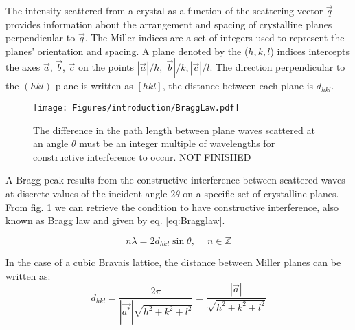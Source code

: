 The intensity scattered from a crystal as a function of the scattering vector $\vec{q}$ provides information about the arrangement and spacing of crystalline planes perpendicular to $\vec{q}$.
The Miller indices are a set of integers used to represent the planes' orientation and spacing.
A plane denoted by the ($h, k, l$) indices intercepts the axes $\vec{a}$, $\vec{b}$, $\vec{c}$ on the points $|\vec{a}|/h, |\vec{b}|/k, |\vec{c}|/l$.
The direction perpendicular to the $(hkl)$ plane is written as $[hkl]$, the distance between each plane is $d_{hkl}$.

\begin{figure}[!htb]
    \centering
    \texttt{[image: Figures/introduction/BraggLaw.pdf]}
    \caption{The difference in the path length between plane waves scattered at an angle $\theta$ must be an integer multiple of wavelengths for constructive interference to occur. NOT FINISHED}
    \label{fig:BraggLaw}
\end{figure}

A Bragg peak results from the constructive interference between scattered waves at discrete values of the incident angle $2\theta$ on a specific set of crystalline planes.
From fig. \ref{fig:BraggLaw} we can retrieve the condition to have constructive interference, also known as Bragg law and given by eq. \eqref{eq:Bragglaw}.

\begin{equation}
    \label{eq:Bragglaw}
    n\lambda = 2d_{hkl} \sin{\theta}, \quad \ n \in \mathbb{Z}
\end{equation}


In the case of a cubic Bravais lattice, the distance between Miller planes can be written as:
\begin{equation}
    \label{eq:Interplanarspacing}
    d_{hkl}=\frac{2\pi}{|\vec{a^*}|\sqrt{h^2 + k^2 + l^2}}=\frac{|\vec{a}|}{\sqrt{h^2 + k^2 + l^2}}
\end{equation}

